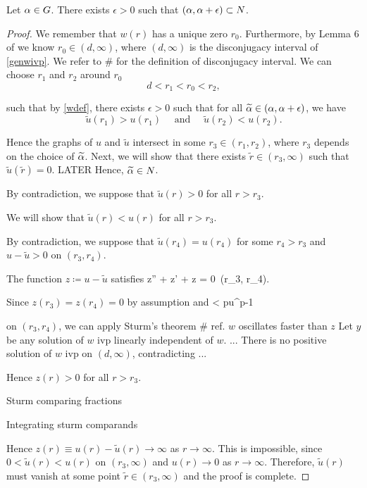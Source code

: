 \begin{lemma}\label{genlem7}
Let $\alpha \in G$. There exists $\epsilon > 0$ such that $(\alpha, \alpha + \epsilon)
\subset N$. 
\end{lemma}
\begin{proof}
We remember that $w(r)$ has a unique zero $r_0$. 
Furthermore, by Lemma 6 of \cite[p.~249]{kwong} we know $r_0 \in (d,
\infty)$, where $(d, \infty)$ is the disconjugacy interval of \eqref{genwivp}.
We refer to \# for the definition of disconjugacy interval. We can choose
$r_1$ and $r_2$ around $r_0$
\[ d < r_1 < r_0 < r_2, \]

such that by \eqref{wdef}, there exists $\epsilon > 0$ 
such that for all $\widetilde{\alpha} \in (\alpha, \alpha + \epsilon)$, we have
\[
\tilde{u}(r_1) > u(r_1)\quad\text{ and }\quad \tilde{u}(r_2) < u(r_2).
\]

Hence the graphs of $u$ and $\tilde{u}$ intersect in some $r_3 \in (r_1, r_2)$,
where $r_3$ depends on the choice of $\widetilde{\alpha}$. Next, we will show that there
exists $\tilde{r} \in (r_3, \infty)$ such that $\tilde{u}(\tilde{r}) = 0$.
{\red LATER Hence, $\widetilde{\alpha} \in N$.}

By contradiction, we suppose that $\tilde{u}(r) > 0$ for all $r > r_3$.

We will show that $\tilde{u}(r) < u(r)$ for all $r > r_3$.

By contradiction, we suppose that $\tilde{u}(r_4) = u(r_4)$ for some $r_4 > r_3$
and $u - \tilde{u} > 0$ on $(r_3, r_4)$.

The function $z \coloneqq u - \tilde{u}$ satisfies
\be \label{zivp}
z'' +  z' +  z = 0\quad{}~(r_3, r_4). 
\ee


Since $z(r_3) = z(r_4) = 0$ by assumption and
\be \label{zcomp} 
 < pu^{p-1} 
\ee

on $(r_3, r_4)$, we can apply Sturm's theorem \# ref. {\red $w$ oscillates
faster than $z$} Let $y$ be any solution of $w$ ivp linearly independent of
$w$. ... There is no positive solution of $w$ ivp on $(d, \infty)$,
contradicting ...

Hence $z(r) > 0$ for all $r > r_3$. %

Sturm comparing fractions

Integrating sturm comparands

Hence $z(r) \equiv u(r) - \tilde{u}(r) \to \infty$ as $r \to \infty$. This is
impossible, since $0 < \tilde{u}(r) < u(r)$ on $(r_3, \infty)$ and $u(r) \to 0$
as $r \to \infty$. Therefore, $\tilde{u}(r)$ must vanish at some point
$\tilde{r} \in (r_3, \infty)$ and the proof is complete.
 
\end{proof}

